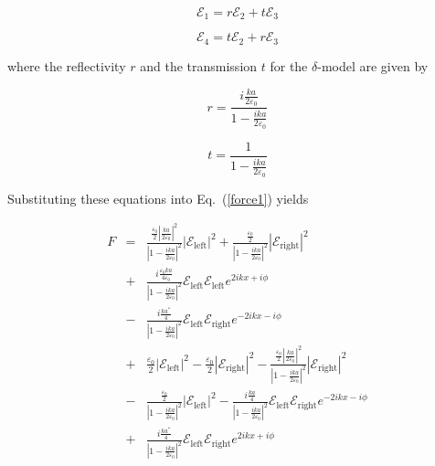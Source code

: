 \documentclass[twocolumn,english,pra,aps,superscriptaddress,floatfix]{revtex4-1}
\begin{document}
\begin{equation}
\mathcal{E}_{1}=r\mathcal{E}_{2}+t\mathcal{E}_{3}
\label{E1}
\end{equation}


\begin{equation}
\mathcal{E}_{4}=t\mathcal{E}_{2}+r\mathcal{E}_{3}
\label{E4}
\end{equation}

where the reflectivity $r$ and the transmission $t$ for the $\delta$-model are given by \cite{us}

\begin{equation}
r=\frac{i\frac{k a}{2\varepsilon_{0}}}{1-\frac{ik a}{2\varepsilon_{0}}}
\label{reflectivity}
\end{equation}


\begin{equation}
t=\frac{1}{1-\frac{ik a}{2\varepsilon_{0}}}
\label{transmission}
\end{equation}

Substituting these equations into Eq.\ (\ref{force1}) yields

\begin{eqnarray}
F&=&\frac{\frac{\varepsilon_{0}}{2}\left|\frac{k a}{2\varepsilon_{0}}\right|^{2}}{\left|1-\frac{ika}{2\varepsilon_{0}}\right|^{2}}\left|\mathcal{E}_{\mathrm{left}}\right|^{2}+\frac{\frac{\varepsilon_{0}}{2}}{\left|1-\frac{ika}{2\varepsilon_{0}}\right|^{2}}\left|\mathcal{E}_{\mathrm{right}}\right|^{2} \nonumber \\
&+&\frac{i\frac{\varepsilon_{0}ka}{4\varepsilon_{0}}}{\left|1-\frac{ika}{2\varepsilon_{0}}\right|^{2}}\mathcal{E}_{\mathrm{left}}\mathcal{E}_{\mathrm{left}}e^{2ikx+i\phi}\nonumber \\
&-&\frac{i\frac{ka^{*}}{4}}{\left|1-\frac{ika}{2\varepsilon_{0}}\right|^{2}}\mathcal{E}_{\mathrm{left}}\mathcal{E}_{\mathrm{right}}e^{-2ikx-i\phi} \nonumber \\
&+&\frac{\varepsilon_{0}}{2}\left|\mathcal{E}_{\mathrm{left}}\right|^{2}-\frac{\varepsilon_{0}}{2}\left|\mathcal{E}_{\mathrm{right}}\right|^{2}-\frac{\frac{\varepsilon_{0}}{2}\left|\frac{ka}{2\varepsilon_{0}}\right|^{2}}{\left|1-\frac{ika}{2\varepsilon_{0}}\right|^{2}}\left|\mathcal{E}_{\mathrm{right}}\right|^{2} \nonumber \\
&-&\frac{\frac{\varepsilon_{0}}{2}}{\left|1-\frac{ika}{2\varepsilon_{0}}\right|^{2}}\left|\mathcal{E}_{\mathrm{left}}\right|^{2}-\frac{i\frac{ka}{4}}{\left|1-\frac{ika}{2\varepsilon_{0}}\right|^{2}}\mathcal{E}_{\mathrm{left}}\mathcal{E}_{\mathrm{right}}e^{-2ikx-i\phi} \nonumber \\
&+&\frac{i\frac{ka^{*}}{4}}{\left|1-\frac{ika}{2\varepsilon_{0}}\right|^{2}}\mathcal{E}_{\mathrm{left}}\mathcal{E}_{\mathrm{right}}e^{2ikx+i\phi}
\label{f1}
\end{eqnarray}
\end{document}

